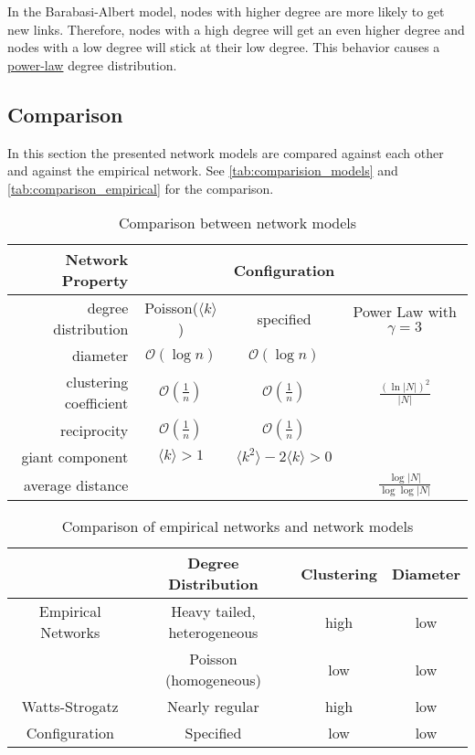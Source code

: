 \documentclass[english]{panikzettel}
\begin{document}
In the Barabasi-Albert model, nodes with higher degree are more likely to get new links.
Therefore, nodes with a high degree will get an even higher degree and nodes with a low degree will stick at their low degree.
This behavior causes a \hyperref[sec:power_law]{power-law} degree distribution.

\subsection{Comparison}
In this section the presented network models are compared against each other and against the empirical network. See \autoref{tab:comparision_models} and \autoref{tab:comparison_empirical} for the comparison.

\begin{table}[ht!]
	\centering
	\begin{tabular}{|r||c|c|c|}
		\hline
		Network Property & \erdosrenyi & Configuration & \barabasi \\
		\hline
		degree distribution & Poisson($ \langle k \rangle $) & specified & Power Law with $ \gamma = 3 $ \\
		diameter & $ \mathcal{O}(\log n) $ & $ \mathcal{O}(\log n) $ & \\
		clustering coefficient & $\mathcal{O}(\frac{1}{n}) $ & $\mathcal{O}(\frac{1}{n}) $ & $\frac{(\ln |N|)^2}{|N|}$ \\
		reciprocity & $ \mathcal{O}(\frac{1}{n}) $ & $ \mathcal{O}(\frac{1}{n}) $ & \\
		giant component & $ \langle k \rangle > 1 $ & $ \langle k^2 \rangle - 2 \langle k \rangle > 0 $ & \\
		average distance & & & $ \frac{\log |N|}{\log \log |N|} $ \\
		\hline
	\end{tabular}
	\caption{Comparison between network models}
	\label{tab:comparision_models}
\end{table}

\begin{table}[ht!]
	\centering
	\begin{tabular}{|c|c|c|c|}
		\hline
		& Degree Distribution & Clustering & Diameter \\
		\hline
		Empirical Networks & Heavy tailed, heterogeneous & high & low \\
		\hline
		\erdosrenyi & Poisson (homogeneous) & low & low \\
		\hline
		Watts-Strogatz & Nearly regular & high & low \\
		\hline
		Configuration & Specified & low & low \\
		\hline
	\end{tabular}
	\caption{Comparison of empirical networks and network models}
	\label{tab:comparison_empirical}
\end{table}
\end{document}
